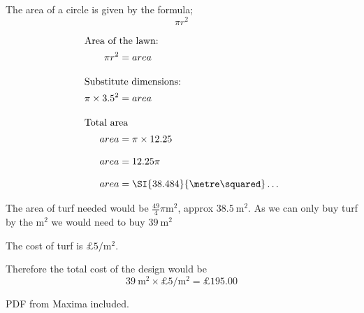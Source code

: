 \documentclass[a4paper]{tufte-handout}
\begin{document}
\begin{question}

The area of a circle is given by the formula; \[\pi r^{2}\]

\begin{align*}
\shortintertext{Area of the lawn: }
\pi r^{2} &= area\\[8pt]
\shortintertext{Substitute dimensions: }
\pi \times 3.5^{2}&=area\\[8pt]
\shortintertext{Total area}
area &=\pi \times 12.25\\[8pt]
area &=12.25\pi\\[8pt]
area &= \SI{38.484}{\metre\squared}\ldots\\
\end{align*}

The area of turf needed would be $\frac{49}{4}\pi \unit{\metre\squared}$, approx $\SI{38.5}{\metre\squared}$. As we can only buy turf by the $\unit{\metre\squared}$ we would need to buy $\SI{39}{\metre\squared}$

The cost of turf is $\pounds5\unit{\per\metre\squared}$.

Therefore the total cost of the design would be \[\SI{39}{\metre\squared} \times \pounds5\unit{\per\metre\squared}=\pounds195.00\] 

\end{question}  

\begin{question}

PDF from Maxima included.


\end{question}
\end{document}
